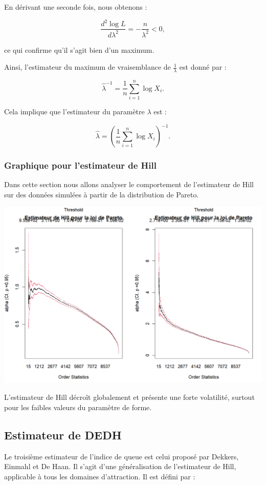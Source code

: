 \documentclass{article}
\begin{document}
En dérivant une seconde fois, nous obtenons :

\[
\frac{d^2 \log L}{d \lambda^2} = -\frac{n}{\lambda^2} < 0,
\]

ce qui confirme qu'il s'agit bien d'un maximum.  

Ainsi, l'estimateur du maximum de vraisemblance de \( \frac{1}{\lambda} \) est donné par :

\[
\hat{\lambda}^{-1} = \frac{1}{n} \sum_{i=1}^{n} \log X_i.
\]

Cela implique que l'estimateur du paramètre \( \lambda \) est :

\[
\hat{\lambda} = \left( \frac{1}{n} \sum_{i=1}^{n} \log X_i \right)^{-1}.
\]
\subsubsection{Graphique pour l'estimateur de Hill}
Dans cette section nous allons analyser le comportement de l'estimateur de Hill sur des données simulées à partir de la distribution de Pareto.
\begin{center}
	\includegraphics[scale=0.6]{./Codes_R/estimateur_hill_pareto.png} 
\end{center}
L’estimateur de Hill décroît globalement et présente une forte volatilité, surtout pour les faibles valeurs du paramètre de forme.
\subsection{Estimateur de DEDH}
Le troisième estimateur de l'indice de queue est celui proposé par Dekkers, Einmahl et De Haan. Il s'agit d'une généralisation de l'estimateur de Hill, applicable à tous les domaines d'attraction. Il est défini par :
\end{document}
